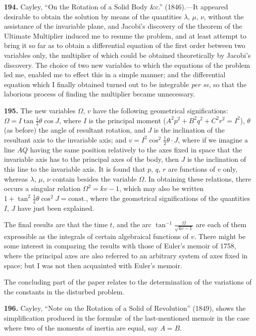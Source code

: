\documentclass[11pt,a4paper]{article}
\theoremstyle{definition}
\begin{document}
\textbf{194.} Cayley, ``On the Rotation of a Solid Body \&c.'' (1846).---It appeared desirable to obtain the solution by means of the quantities $\lambda$, $\mu$, $\nu$, without the assistance of the invariable plane, and Jacobi's discovery of the theorem of the Ultimate Multiplier induced me to resume the problem, and at least attempt to bring it so far as to obtain a differential equation of the first order between two variables only, the multiplier of which could be obtained theoretically by Jacobi's discovery. The choice of two new variables to which the equations of the problem led me, enabled me to effect this in a simple manner; and the differential equation which I finally obtained turned out to be integrable \textit{per se}, so that the laborious process of finding the multiplier became unnecessary.

\textbf{195.} The new variables $\Omega$, $v$ have the following geometrical significations: $\Omega = I\tan\frac{1}{2}\theta\cos J$, where $I$ is the principal moment ($A^2p^2 + B^2q^2 + C^2r^2 = I^2$), $\theta$ (as before) the angle of resultant rotation, and $J$ is the inclination of the resultant axis to the invariable axis; and $v = I^2\cos^2\frac{1}{2}\theta \cdot J$, where if we imagine a line $AQ$ having the same position relatively to the axes fixed in space that the invariable axis has to the principal axes of the body, then $J$ is the inclination of this line to the invariable axis. It is found that $p$, $q$, $r$ are functions of $v$ only, whereas $\lambda$, $\mu$, $\nu$ contain besides the variable $\Omega$. In obtaining these relations, there occurs a singular relation $\Omega^2 = kv - 1$, which may also be written $1 + \tan^2\frac{1}{2}\theta\cos^2 J = \text{const.}$, where the geometrical significations of the quantities $I$, $J$ have just been explained.

The final results are that the time $t$, and the arc $\tan^{-1}\frac{\Omega}{\sqrt{kv - 1}}$ are each of them expressible as the integrals of certain algebraical functions of $v$. There might be some interest in comparing the results with those of Euler's memoir of 1758, where the principal axes are also referred to an arbitrary system of axes fixed in space; but I was not then acquainted with Euler's memoir.

The concluding part of the paper relates to the determination of the variations of the constants in the disturbed problem.

\textbf{196.} Cayley, ``Note on the Rotation of a Solid of Revolution'' (1849), shows the simplification produced in the formul\ae\ of the last-mentioned memoir in the case where two of the moments of inertia are equal, say $A = B$.
\end{document}
